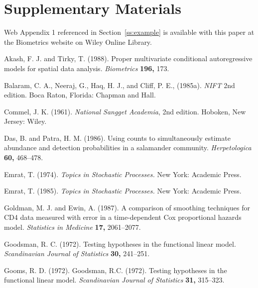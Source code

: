\documentclass[useAMS,usenatbib,referee]{example/biom}
\begin{document}
\section*{Supplementary Materials}

Web Appendix 1 referenced in Section~\ref{ss:example} is available
with this paper at the Biometrics website on Wiley Online Library.
\vspace*{-8pt}


\begin{thebibliography}{}
Akash, F. J. and Tirky, T. (1988). Proper multivariate conditional
autoregressive models for spatial data analysis. {\it Biometrics} {\bf 196,} 173.

Balaram, C. A., Neeraj, G., Haq, H. J., and Cliff, P. E., (1985a). {\it
NIFT\/} 2nd edition. Boca Raton, Florida: Chapman and Hall.

Commel, J. K. (1961). {\it National Sangget Academia}, 2nd edition.
Hoboken, New Jersey: Wiley.

Das, B. and Patra, H. M. (1986). Using counts to simultaneously estimate
abundance and detection probabilities in a salamander community. {\it
Herpetologica} {\bf 60,} 468--478.

 Emrat, T. (1974).
{\it Topics in Stochastic Processes.} New York: Academic  Press.

 Emrat, T. (1985).
{\it Topics in Stochastic Processes.} New York: Academic  Press.

Goldman, M. J. and Ewin, A. (1987). A comparison of smoothing
techniques for CD4 data measured with error in a time-dependent Cox
proportional hazards model. {\it Statistics in Medicine} {\bf 17,} 2061--2077.

Goodsman, R. C. (1972). Testing hypotheses in the functional linear
model. {\it Scandinavian Journal of Statistics} {\bf 30,} 241--251.

 Gooms, R. D.
(1972). Goodsman, R.C. (1972). Testing hypotheses in the functional linear
model. {\it Scandinavian Journal of Statistics} {\bf 31,} 315--323.



\end{thebibliography}
\end{document}
